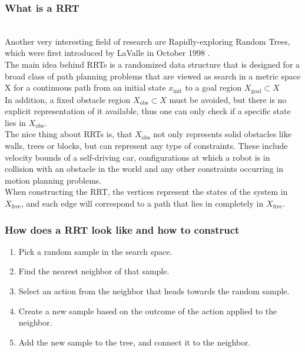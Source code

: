 \documentclass[conference]{IEEEtran}
\begin{document}
\subsubsection{What is a RRT}
\quad \\
Another very interesting field of research are Rapidly-exploring Random Trees, which were first introduced by LaValle in October 1998 \cite{LaValle.October1998}.\\
The main idea behind RRTs is a randomized data structure that is designed for a broad class of path planning problems that are viewed as search in a metric space X for a continuous path from an initial state $x_{\text{init}}$ to a goal region $X_\text{goal} \subset X$\\
In addition, a fixed obstacle region $X_\text{obs} \subset X$ must be avoided, but there is no explicit representation of it available, thus one can only check if a specific state lies in $X_\text{obs}$.\\
The nice thing about RRTs is, that $X_\text{obs}$ not only represents solid obstacles like walls, trees or blocks, but can represent any type of constraints. These include velocity bounds of a self-driving car, configurations at which a robot is in collision with an obstacle in the world and any other constraints occurring in motion planning problems.\\
When constructing the RRT, the vertices represent the states of the system in $X_\text{free}$, and each edge will correspond to a path that lies in completely in $X_\text{free}$. \cite{LaValle.October1998}\\

\subsubsection{How does a RRT look like and how to construct}
\begin{enumerate}
\item Pick a random sample in the search space.
\item Find the nearest neighbor of that sample.
\item Select an action from the neighbor that heads towards the random sample.
\item Create a new sample based on the outcome of the action applied to the neighbor.
\item Add the new sample to the tree, and connect it to the neighbor.
\end{enumerate}
\end{document}
